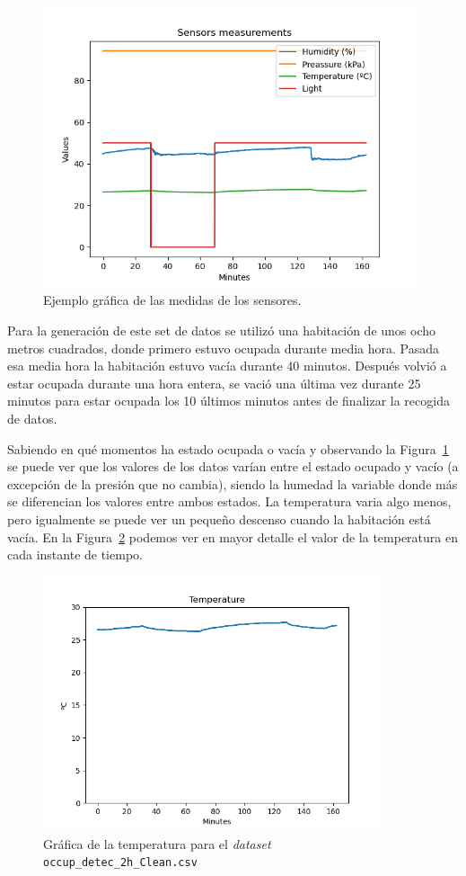 \documentclass[a4paper, 12pt]{book}
\begin{document}
\begin{figure}[]
  \centering
  \includegraphics[width=11cm, keepaspectratio]{img/Data_occup_detec_2h_original.png}
  \caption{Ejemplo gráfica de las medidas de los sensores.}\label{fig:ejemplo_gráfica}
\end{figure}

Para la generación de este set de datos se utilizó una habitación de unos ocho metros cuadrados, donde primero estuvo ocupada durante media hora. Pasada esa media hora la habitación estuvo vacía durante 40 minutos. Después volvió a estar ocupada durante una hora entera, se vació una última vez durante 25 minutos para estar ocupada los 10 últimos minutos antes de finalizar la recogida de datos.

Sabiendo en qué momentos ha estado ocupada o vacía y observando la Figura~\ref{fig:ejemplo_gráfica} se puede ver que los valores de los datos varían entre el estado ocupado y vacío (a excepción de la presión que no cambia), siendo la humedad la variable donde más se diferencian los valores entre ambos estados. La temperatura varia algo menos, pero igualmente se puede ver un pequeño descenso cuando la habitación está vacía. En la Figura~\ref{fig:graf_temp} podemos ver en mayor detalle el valor de la temperatura en cada instante de tiempo.

\begin{figure}[]
  \centering
  \includegraphics[width=10cm, keepaspectratio]{img/Temp_occup_detec_2h_original.png}
  \caption{Gráfica de la temperatura para el \textit{dataset} \texttt{occup\_detec\_2h\_Clean.csv}}\label{fig:graf_temp}
\end{figure}
\end{document}
